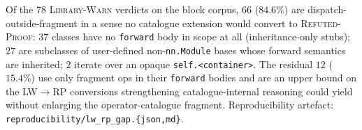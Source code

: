 Of the $78$ \textsc{Library-Warn} verdicts on the block corpus,
$66$ ($84.6\%$) are dispatch-outside-fragment in a sense no
catalogue extension would convert to \textsc{Refuted-Proof}:
$37$ classes have no \texttt{forward} body in scope at all
(inheritance-only stubs);
$27$ are subclasses of user-defined non-\texttt{nn.Module} bases
whose forward semantics are inherited;
$2$ iterate over an opaque \texttt{self.<container>}.
The residual $12$ ($15.4\%$) use only fragment ops in their
\texttt{forward} bodies and are an upper bound on the
\textsc{LW}$\to$\textsc{RP} conversions strengthening
catalogue-internal reasoning could yield without enlarging the
operator-catalogue fragment.  Reproducibility artefact:
\texttt{reproducibility/lw\_rp\_gap.\{json,md\}}.
